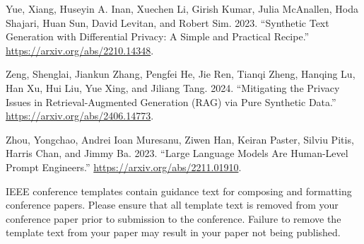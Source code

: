 \documentclass[conference]{IEEEtran}
\begin{document}
\begin{thebibliography}{00}
Yue, Xiang, Huseyin A. Inan, Xuechen Li, Girish Kumar, Julia McAnallen,
Hoda Shajari, Huan Sun, David Levitan, and Robert Sim. 2023.
{``Synthetic Text Generation with Differential Privacy: A Simple and
Practical Recipe.''} \url{https://arxiv.org/abs/2210.14348}.

Zeng, Shenglai, Jiankun Zhang, Pengfei He, Jie Ren, Tianqi Zheng,
Hanqing Lu, Han Xu, Hui Liu, Yue Xing, and Jiliang Tang. 2024.
{``Mitigating the Privacy Issues in Retrieval-Augmented Generation (RAG)
via Pure Synthetic Data.''} \url{https://arxiv.org/abs/2406.14773}.

Zhou, Yongchao, Andrei Ioan Muresanu, Ziwen Han, Keiran Paster, Silviu
Pitis, Harris Chan, and Jimmy Ba. 2023. {``Large Language Models Are
Human-Level Prompt Engineers.''} \url{https://arxiv.org/abs/2211.01910}.
\end{thebibliography}
\vspace{12pt}
\color{red}
IEEE conference templates contain guidance text for composing and formatting conference papers. Please ensure that all template text is removed from your conference paper prior to submission to the conference. Failure to remove the template text from your paper may result in your paper not being published.
\end{document}
